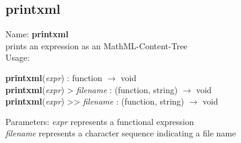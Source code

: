 \subsection{ printxml }
\noindent Name: \textbf{printxml}\\
prints an expression as an MathML-Content-Tree\\

\noindent Usage: 
\begin{center}
\textbf{printxml}(\emph{expr}) : \textsf{function} $\rightarrow$ \textsf{void}\\
\textbf{printxml}(\emph{expr}) > \emph{filename} : (\textsf{function}, \textsf{string}) $\rightarrow$ \textsf{void}\\
\textbf{printxml}(\emph{expr}) >> \emph{filename} : (\textsf{function}, \textsf{string}) $\rightarrow$ \textsf{void}\\
\end{center}
Parameters: 
\emph{expr} represents a functional expression\\
\emph{filename} represents a character sequence indicating a file name\\

